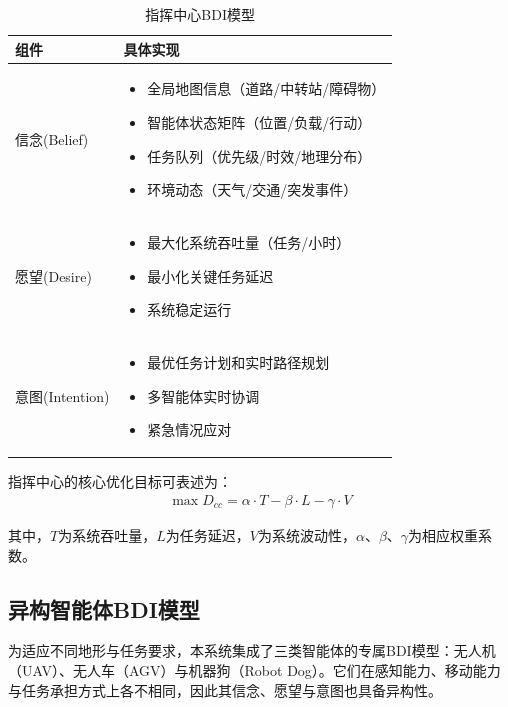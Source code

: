 \documentclass[12pt,a4paper]{article}
\begin{document}
\begin{table}[h]
	\centering
	\caption{指挥中心BDI模型}
	\label{tab:command-center-bdi}
	\begin{tabular}{|>{\centering\arraybackslash}p{3cm}|>{\raggedright\arraybackslash}p{11cm}|}
		\hline
		\textbf{组件} & \textbf{具体实现} \\
		\hline
		\rowcolor{lightgray}
		信念(Belief) & 
		\begin{itemize}[leftmargin=*,nosep]
			\item 全局地图信息（道路/中转站/障碍物）
			\item 智能体状态矩阵（位置/负载/行动）
			\item 任务队列（优先级/时效/地理分布）
			\item 环境动态（天气/交通/突发事件）
		\end{itemize} \\
		\hline
		愿望(Desire) & 
		\begin{itemize}[leftmargin=*,nosep]
			\item 最大化系统吞吐量（任务/小时）
			\item 最小化关键任务延迟
			\item 系统稳定运行
		\end{itemize} \\
		\hline
		\rowcolor{lightgray}
		意图(Intention) & 
		\begin{itemize}[leftmargin=*,nosep]
			\item 最优任务计划和实时路径规划
			\item 多智能体实时协调
			\item 紧急情况应对
		\end{itemize} \\
		\hline
	\end{tabular}
\end{table}

指挥中心的核心优化目标可表述为：
\begin{align}
\max D_{cc} = \alpha \cdot T - \beta \cdot L - \gamma \cdot V
\end{align}

其中，$T$为系统吞吐量，$L$为任务延迟，$V$为系统波动性，$\alpha$、$\beta$、$\gamma$为相应权重系数。

\subsection{异构智能体BDI模型}

为适应不同地形与任务要求，本系统集成了三类智能体的专属BDI模型：无人机（UAV）、无人车（AGV）与机器狗（Robot Dog）。它们在感知能力、移动能力与任务承担方式上各不相同，因此其信念、愿望与意图也具备异构性。
\end{document}

